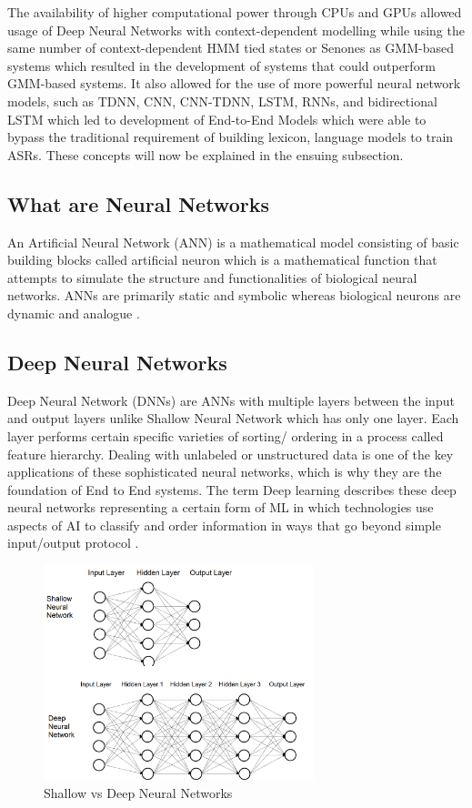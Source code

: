 The availability of higher computational power through CPUs and GPUs allowed usage of Deep Neural Networks with context-dependent modelling while using the same number of context-dependent HMM tied states or Senones as GMM-based systems which resulted in the development of systems that could outperform GMM-based systems. It also allowed for the use of more powerful neural network models, such as TDNN, CNN, CNN-TDNN, LSTM, RNNs, and bidirectional LSTM \cite{bell_adaptation_2021} which led to development of End-to-End Models which were able to bypass the traditional requirement of building lexicon, language models to train ASRs. These concepts will now be explained in the ensuing subsection.

\subsection{What are Neural Networks}

An Artificial Neural Network (ANN) is a mathematical model consisting of basic building blocks called artificial neuron which is a mathematical function that attempts to simulate the structure and functionalities of biological neural networks. ANNs are primarily static and symbolic whereas biological neurons are dynamic and analogue \cite{backstrom_introduction_2022}.

\subsection{Deep Neural Networks}
Deep Neural Network (DNNs) are ANNs with multiple layers between the input and output layers unlike Shallow Neural Network which has only one layer. Each layer performs certain specific varieties of sorting/ ordering in a process called feature hierarchy. Dealing with unlabeled or unstructured data is one of the key applications of these sophisticated neural networks, which is why they are the foundation of End to End systems. The term Deep learning describes these deep neural networks representing a certain form of ML in which technologies use aspects of AI to classify and order information in ways that go beyond simple input/output protocol \cite{backstrom_introduction_2022}.
 
\begin{figure}[h!]
    \centering
    \includegraphics[width=0.7\textwidth]{img/DNN.png}
    \caption{Shallow vs Deep Neural Networks}
    \label{fig:shallow-deep-NN}
\end{figure}

